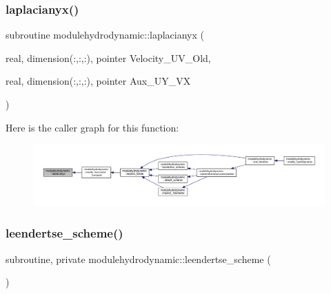 \subsubsection{\texorpdfstring{laplacianyx()}{laplacianyx()}}
{\footnotesize\ttfamily subroutine modulehydrodynamic\+::laplacianyx (\begin{DoxyParamCaption}\item[{real, dimension(\+:,\+:,\+:), pointer}]{Velocity\+\_\+\+U\+V\+\_\+\+Old,  }\item[{real, dimension(\+:,\+:,\+:), pointer}]{Aux\+\_\+\+U\+Y\+\_\+\+VX }\end{DoxyParamCaption})\hspace{0.3cm}{\ttfamily [private]}}

Here is the caller graph for this function\+:\nopagebreak
\begin{figure}[H]
\begin{center}
\leavevmode
\includegraphics[width=350pt]{namespacemodulehydrodynamic_a24dd92fa72c14784cca1137f274f1cbd_icgraph}
\end{center}
\end{figure}
\mbox{\label{namespacemodulehydrodynamic_a8ca7371a9688becd96976013be92880a}} 
\subsubsection{\texorpdfstring{leendertse\+\_\+scheme()}{leendertse\_scheme()}}
{\footnotesize\ttfamily subroutine, private modulehydrodynamic\+::leendertse\+\_\+scheme (\begin{DoxyParamCaption}{ }\end{DoxyParamCaption})\hspace{0.3cm}{\ttfamily [private]}}

